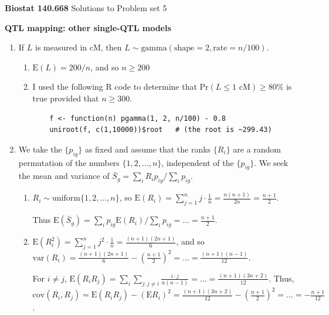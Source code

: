 \documentclass[12pt]{article}
\begin{document}
\thispagestyle{empty}

\noindent \textbf{Biostat 140.668} \hfill Solutions to Problem set 5

\bigskip 

\noindent \textbf{QTL mapping: other single-QTL models}

\begin{enumerate}

\item If $L$ is measured in cM, then $L \sim
\text{gamma}(\text{shape}=2, \text{rate} = n/100)$.  

\begin{enumerate}
\item $\text{E}(L) = 200/n$, and so $n \ge 200$
\item I used the following R code to determine that $\text{Pr}(L \le 1
\text{ cM})
\ge 80\%$ is true provided that $n \ge 300$.

\begin{verbatim}
    f <- function(n) pgamma(1, 2, n/100) - 0.8
    uniroot(f, c(1,10000))$root   # (the root is ~299.43)
\end{verbatim} %

\end{enumerate}

\item We take the $\{p_{ig}\}$ as fixed and assume that the ranks
$\{R_i\}$ are a random permutation of the numbers $\{1, 2, \dots,
n\}$, independent of the $\{p_{ig}\}$.  We seek the mean and variance
of $\bar{S}_g = \sum_i R_i p_{ig} / \sum_i p_{ig}$.

\begin{enumerate}
\item $R_i \sim \text{uniform}\{1, 2, \dots, n\}$, so $\text{E}(R_i) =
\sum_{j=1}^{n} j \cdot \frac{1}{n} = \frac{n(n+1)}{2n} =
\frac{n+1}{2}$.

Thus $\text{E}(\bar{S}_g) = \sum_i p_{ig} \text{E}(R_i) / \sum_i
p_{ig} = \dots = \frac{n+1}{2}$.

\item $\text{E}(R_i^2) = \sum_{j=1}^{n} j^2 \cdot
\frac{1}{n} = \frac{(n+1)(2n+1)}{6}$, and so $\text{var}(R_i) =
\frac{(n+1)(2n+1)}{6} - \left(\frac{n+1}{2}\right)^2 = \dots =
\frac{(n+1)(n-1)}{12}$.

For $i \ne j$, $\text{E}(R_i R_j) = \sum_i \sum_{j:j \ne i}
\frac{i \cdot j}{n(n-1)} = \dots = \frac{(n+1)(3n+2)}{12}$.  Thus,
$\text{cov}(R_i, R_j) = \text{E}(R_i R_j) - (\text{E} R_i)^2 =
\frac{(n+1)(3n+2)}{12} - (\frac{n+1}{2})^2 = \dots = -\frac{n+1}{12}$.


\end{enumerate}
\end{enumerate}
\end{document}

